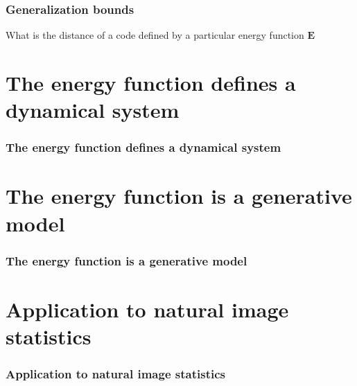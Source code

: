 \documentclass{beamer}
\begin{document}
\begin{frame}[plain]
\frametitle{Generalization bounds}
What is the distance of a code defined by a particular energy function $\mathbf{E}$
\end{frame}

\section{The energy function defines a dynamical system} 

\begin{frame}[plain]
\frametitle{The energy function defines a dynamical system} 
\end{frame}


\section{The energy function is a generative model} 

\begin{frame}[plain]
\frametitle{The energy function is a generative model} 
\end{frame}

\section{Application to natural image statistics} 

\begin{frame}[plain]
\frametitle{Application to natural image statistics} 
\end{frame}
\end{document}
